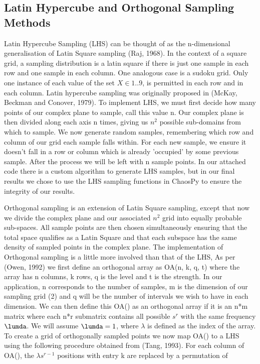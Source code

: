 \documentclass{article}
\begin{document}
    \subsection*{Latin Hypercube and Orthogonal Sampling Methods}

    Latin Hypercube Sampling (LHS) can be thought of as the n-dimensional generalisation of Latin Square sampling (Raj, 1968). In the context of a square grid, a sampling distribution is a latin square if there is just one sample in each row and one sample in each column. One analogous case is a sudoku grid. Only one instance of each value of the set $X \in {1 .. 9}$, is permitted in each row and in each column. Latin hypercube sampling was originally proposed in (McKay, Beckman and Conover, 1979). To implement LHS, we must first decide how many points of our complex plane to sample, call this value n. Our complex plane is then divided along each axis n times, giving us $n^2$ possible sub-domains from which to sample. We now generate random samples, remembering which row and column of our grid each sample falls within. For each new sample, we ensure it doesn't fall in a row or column which is already 'occupied' by some previous sample. After the process we will be left with n sample points. In our attached code there is a custom algorithm to generate LHS samples, but in our final results we chose to use the LHS sampling functions in ChaosPy to ensure the integrity of our results.

    Orthogonal sampling is an extension of Latin Square sampling, except that now we divide the complex plane and our associated $n^2$ grid into equally probable sub-spaces. All sample points are then chosen simultaneously ensuring that the total space qualifies as a Latin Square and that each subspace has the same density of sampled points in the complex plane. The implementation of Orthogonal sampling is a little more involved than that of the LHS, As per (Owen, 1992) we first define an orthogonal array as OA(n, k, q, t) where the array has n columns, k rows, q is the level and t is the strength. In our application, n corresponds to the number of samples, m is the dimension of our sampling grid (2) and q will be the number of intervals we wish to have in each dimension. We can then define this OA() as an orthogonal array if it is an n*m matrix where each n*r submatrix contains all possible $s^r$ with the same frequency $\lumda$. We will assume $\lumda = 1$, where $\lambda$ is defined as the index of the array. To create a grid of orthogonally sampled points we now map OA() to a LHS using the following procedure obtained from (Tang, 1993). For each column of OA(), the $\lambda s^{r - 1}$ positions with entry k are replaced by a permutation of
\end{document}
